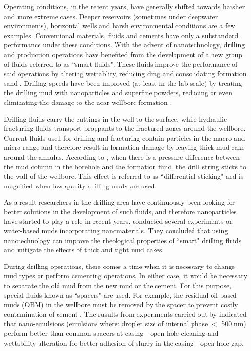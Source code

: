Operating conditions, in the recent years, have generally shifted towards harsher and more extreme cases. Deeper reservoirs (sometimes under deepwater environments), horizontal wells and harsh environmental conditions are a few examples. Conventional materials, fluids and cements have only a substandard performance under these conditions. With the advent of nanotechnology, drilling and production operations have benefited from the development of a new group of fluids referred to as  ``smart fluids". These fluids improve the performance of said operations by altering wettablity, reducing drag and consolidating formation sand \citep{Wasan2003, Chaudhury2003, Amanullah2009}. Drilling speeds have been improved (at least in the lab scale) by treating the drilling mud with nanoparticles and superfine powders, reducing or even eliminating the damage to the near wellbore formation \citep{Esmaeili2011}.

Drilling fluids carry the cuttings  in the well to the surface, while hydraulic fracturing  fluids transport proppants to the fractured zones around the wellbore. Current fluids used for drilling and fracturing contain particles in the macro and micro range and therefore result in formation damage by leaving thick mud cake around the annulus. According to \citet{Outmans1958}, when there is a pressure difference between the mud column in the borehole and the formation fluid, the drill string sticks to the wall of the wellbore. This effect is referred to as ``differential sticking" and is magnified when low quality drilling muds are used. 

As a result researchers in the drilling area have continuously been looking for better solutions in the development of such fluids, and therefore nanoparticles have started to play a role in recent years. \citet{Amanullah2011} conducted several experiments on water-based muds incorporating nanomaterials. They concluded that using nanotechnology can improve the rheological properties of ``smart" drilling fluids and mitigate the effects of thick and tight mud cakes. 

During drilling operations, there comes a time when it is necessary to change mud types or perform cementing operations. In either case, it would be necessary to separate the old mud from the new mud or the cement. For this purpose, special fluids known as ``spacers"  are used. For example, the residual oil-based muds (OBM) in the wellbore must be removed by the spacer to prevent costly contamination of cement \citep{VanZanten2010}. The rusults from experiments carried out by \citet{Maserati2010} indicated that nano-emulsions (emulsions where: droplet size of internal phase $<$ 500 nm) perform better than common spacers at casing - open hole cleaning and wettability alteration for better adhesion of slurry in the casing - open hole gap. 


